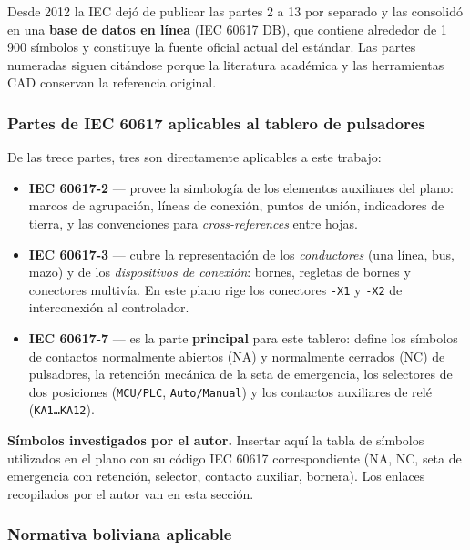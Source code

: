 \documentclass[11pt]{article}
\begin{document}
\begin{norma}
	Desde 2012 la IEC dejó de publicar las partes 2 a 13 por separado y las
	consolidó en una \textbf{base de datos en línea} (IEC 60617 DB), que
	contiene alrededor de 1\,900 símbolos y constituye la fuente oficial
	actual del estándar. Las partes numeradas siguen citándose porque la
	literatura académica y las herramientas CAD conservan la referencia
	original.
\end{norma}

\subsubsection{Partes de IEC 60617 aplicables al tablero de pulsadores}
De las trece partes, tres son directamente aplicables a este trabajo:

\begin{itemize}[leftmargin=1.4em]
	\item \textbf{IEC 60617-2} — provee la simbología de los elementos
	auxiliares del plano: marcos de agrupación, líneas de conexión,
	puntos de unión, indicadores de tierra, y las convenciones para
	\emph{cross-references} entre hojas.
	\item \textbf{IEC 60617-3} — cubre la representación de los
	\emph{conductores} (una línea, bus, mazo) y de los
	\emph{dispositivos de conexión}: bornes, regletas de bornes y
	conectores multivía. En este plano rige los conectores
	\texttt{-X1} y \texttt{-X2} de interconexión al controlador.
	\item \textbf{IEC 60617-7} — es la parte \textbf{principal} para este
	tablero: define los símbolos de contactos normalmente abiertos
	(NA) y normalmente cerrados (NC) de pulsadores, la retención
	mecánica de la seta de emergencia, los selectores de dos
	posiciones (\texttt{MCU/PLC}, \texttt{Auto/Manual}) y los
	contactos auxiliares de relé (\texttt{KA1\dots KA12}).
\end{itemize}

\begin{insertar}
	\textbf{Símbolos investigados por el autor.} Insertar aquí la tabla de
	símbolos utilizados en el plano con su código IEC 60617 correspondiente
	(NA, NC, seta de emergencia con retención, selector, contacto auxiliar,
	bornera). Los enlaces recopilados por el autor van en esta sección.
\end{insertar}

\subsubsection{Normativa boliviana aplicable}
\end{document}
